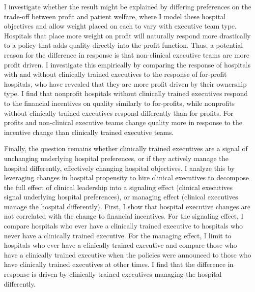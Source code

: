 \documentclass[12pt]{article}
\begin{document}
    I investigate whether the result might be explained by differing preferences on the trade-off between profit and patient welfare, where I model these hospital objectives and allow weight placed on each to vary with executive team type. Hospitals that place more weight on profit will naturally respond more drastically to a policy that adds quality directly into the profit function. Thus, a potential reason for the difference in response is that non-clinical executive teams are more profit driven. I investigate this empirically by comparing the response of hospitals with and without clinically trained executives to the response of for-profit hospitals, who have revealed that they are more profit driven by their ownership type. I find that nonprofit hospitals without clinically trained executives respond to the financial incentives on quality similarly to for-profits, while nonprofits without clinically trained executives respond differently than for-profits. For-profits and non-clinical executive teams change quality more in response to the incentive change than clinically trained executive teams. 

    Finally, the question remains whether clinically trained executives are a signal of unchanging underlying hospital preferences, or if they actively manage the hospital differently, effectively changing hospital objectives. I analyze this by leveraging changes in hospital propensity to hire clinical executives to decompose the full effect of clinical leadership into a signaling effect (clinical executives signal underlying hospital preferences), or managing effect (clinical executives manage the hospital differently). First, I show that hospital executive changes are not correlated with the change to financial incentives. For the signaling effect, I compare hospitals who ever have a clinically trained executive to hospitals who never have a clinically trained executive. For the managing effect, I limit to hospitals who ever have a clinically trained executive and compare those who have a clinically trained executive when the policies were announced to those who have clinically trained executives at other times. I find that the difference in response is driven by clinically trained executives managing the hospital differently. 
\end{document}
